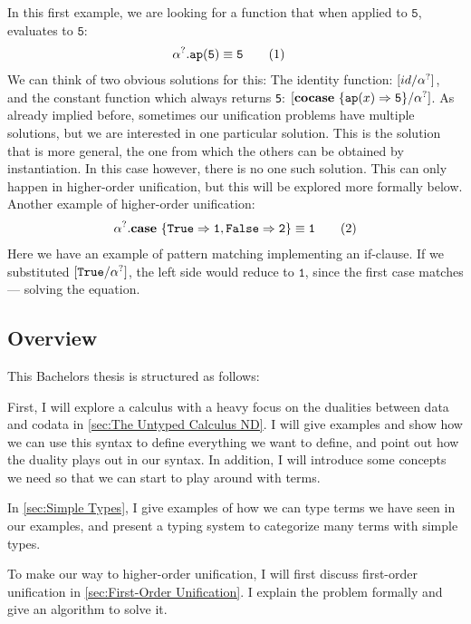 \documentclass[twoside,12pt,a4paper]{article}
\begin{document}
\begin{example}\label{sec:mgu}
    In this first example, we are looking for a function that when applied to $\mathtt{5}$, evaluates to $\mathtt{5}$:
    \begin{align*}
        &\alpha^?.\texttt{ap}(\mathtt{5}) \equiv \mathtt{5}\tag{1} 
    \end{align*}
    We can think of two obvious solutions for this: The identity function: $[id / \alpha^?]$, and the constant function which always returns \texttt{5}: $[\textbf{cocase}\ \{\texttt{ap}(x)\Rightarrow \mathtt{5}\} / \alpha^?]$.
    As already implied before, sometimes our unification problems have multiple solutions, 
    but we are interested in one particular solution. This is the solution that is more general, the one from which the others can be obtained by instantiation.
    In this case however, there is no one such solution. This can only happen in higher-order unification, but this will be explored more formally below.
    Another example of higher-order unification:
    \begin{align*}
    \alpha^?.\textbf{case}\ \{\mathtt{True \Rightarrow 1, False \Rightarrow 2}\}\equiv \mathtt{1} \tag{2}
    \end{align*}
    Here we have an example of pattern matching implementing an if-clause.
    If we substituted $[\mathtt{True / \alpha^?}]$, the left side would reduce to $\mathtt{1}$,
    since the first case matches --- solving the equation.
\end{example}

\subsection{Overview}
This Bachelors thesis is structured as follows:

First, I will explore a calculus with a heavy focus on the dualities between data and codata in \cref{sec:The Untyped Calculus ND}.
I will give examples and show how we can use this syntax to define everything we want to define, and point out how the duality plays out in our syntax.
In addition, I will introduce some concepts we need so that we can start to play around with terms.

In \cref{sec:Simple Types}, I give examples of how we can type terms we have seen in our examples, 
and present a typing system to categorize many terms with simple types.

To make our way to higher-order unification, I will first discuss first-order unification in \cref{sec:First-Order Unification}.
I explain the problem formally and give an algorithm to solve it.
\end{document}
